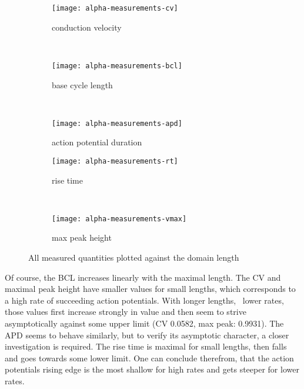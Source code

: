 \begin{figure}[h]
    \centering
    \begin{subfigure}[b]{.3\textwidth}
        \texttt{[image: alpha-measurements-cv]}
        \vspace{-\baselineskip}
        \label{fig:alpha-measure-cv}
        \caption{conduction velocity}
    \end{subfigure}
    \vspace{\baselineskip}
    ~
    \begin{subfigure}[b]{.3\textwidth}
        \texttt{[image: alpha-measurements-bcl]}
        \vspace{-\baselineskip}
        \label{fig:alpha-measure-bcl}
        \caption{base cycle length}
    \end{subfigure}
    ~
    \begin{subfigure}[b]{.3\textwidth}
        \texttt{[image: alpha-measurements-apd]}
        \vspace{-\baselineskip}
        \label{fig:alpha-measure-apd}
        \caption{action potential duration}
    \end{subfigure}
    \begin{subfigure}[b]{.3\textwidth}
        \texttt{[image: alpha-measurements-rt]}
        \vspace{-\baselineskip}
        \label{fig:alpha-measure-rt}
        \caption{rise time}
    \end{subfigure}
    ~
    \begin{subfigure}[b]{.3\textwidth}
        \texttt{[image: alpha-measurements-vmax]}
        \vspace{-\baselineskip}
        \label{fig:alpha-measure-vmax}
        \caption{max peak height}
    \end{subfigure}
    \label{fig:alpha2}
    \caption{All measured quantities plotted against the domain length}
\end{figure}

Of course, the BCL increases linearly with the maximal length.  The CV and
maximal peak height have smaller values for small lengths, which corresponds to
a high rate of succeeding action potentials. With longer lengths, \ie~lower
rates, those values first increase strongly in value and then seem to strive
asymptotically against some upper limit (CV 0.0582, max peak: 0.9931).  The APD
seems to behave similarly, but to verify its asymptotic character, a closer
investigation is required.  The rise time is maximal for small lengths, then
falls and goes towards some lower limit. One can conclude therefrom, that the
action potentials rising edge is the most shallow for high rates and gets
steeper for lower rates.

